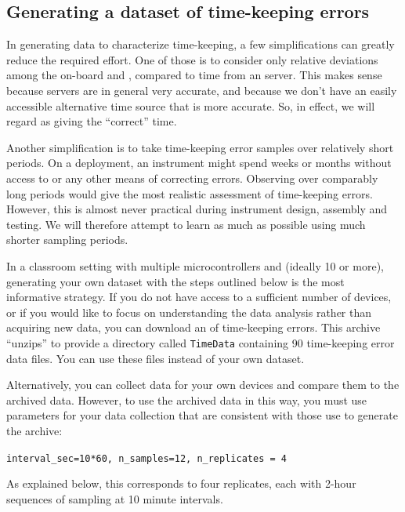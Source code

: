 \subsection{Generating a dataset of time-keeping errors}
In generating data to characterize time-keeping, a few simplifications can greatly reduce the required effort. 
One of those is to consider only relative deviations among the on-board and  \rtcs, compared to time from an \ntp server. 
This makes sense because \ntp servers are in general very accurate, and because we don't have an easily accessible alternative time source that is more accurate.
So, in effect, we will regard \ntp as giving the ``correct'' time.

Another simplification is to take time-keeping error samples over relatively short periods. 
On a deployment, an instrument might spend weeks or months without access to \ntp or any other means of correcting errors. 
Observing \rtcs over comparably long periods would give the most realistic assessment of time-keeping errors.
However, this is almost never practical during instrument design, assembly and testing.
We will therefore attempt to learn as much as possible using much shorter sampling periods.

\begin{kaobox}[frametitle=A download-able dataset of time-keeping errors]
	In a classroom setting with multiple microcontrollers and \rtcs (ideally 10 or more), generating your own dataset with the steps outlined below is the most informative strategy. 
	If you do not have access to a sufficient number of devices, or if you would like to focus on understanding the data analysis rather than acquiring new data, you can download an  of time-keeping errors.
	This archive ``unzips'' to provide a directory called \lstinline{TimeData} containing 90 
	time-keeping error data files.
	You can use these files instead of your own dataset.
	
	\smallskip
	Alternatively, you can collect data for your own devices and compare them to the archived data. 
	However, to use the archived data in this way, you must use parameters for your data collection that are consistent with those use to generate the archive: 
	
	\lstinline{interval_sec=10*60, n_samples=12, n_replicates = 4}
	
	As explained below, this corresponds to four replicates, each with 2-hour sequences of sampling at 10 minute intervals.
\end{kaobox}

